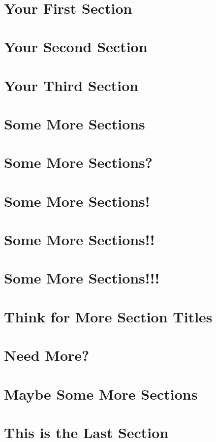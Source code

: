 \documentclass[10pt]{article}
\begin{document}
\def\htitle{Your Title Here}
\def\hauthor{Name}
\hsetup\
\htoc\
\hmain\
\section{Your First Section}
\lipsum[1]
\section{Your Second Section}
\lipsum[2]
\section{Your Third Section}
\lipsum[3]
\section{Some More Sections}
\lipsum[4]
\section{Some More Sections?}
\lipsum[5]
\section{Some More Sections!}
\lipsum[6]
\section{Some More Sections!!}
\lipsum[7]
\section{Some More Sections!!!}
\lipsum[8]
\section{Think for More Section Titles}
\lipsum[9]
\section{Need More?}
\lipsum[10]
\section{Maybe Some More Sections}
\lipsum[11]
\section{This is the Last Section}
\lipsum[12]
\end{document}
